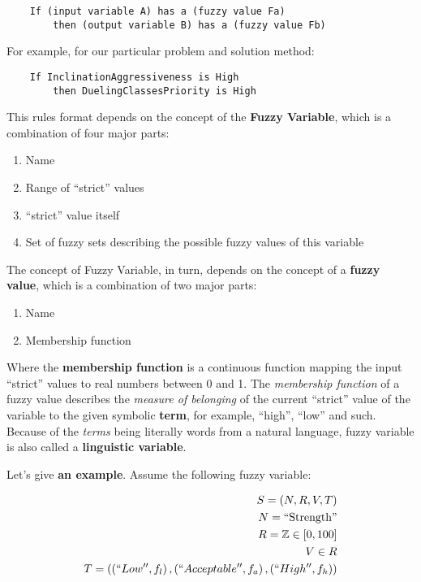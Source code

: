 \documentclass[12pt, a4paper]{article}
\begin{document}
  \begin{verbatim}
    If (input variable A) has a (fuzzy value Fa) 
    	then (output variable B) has a (fuzzy value Fb)
  \end{verbatim}

  For example, for our particular problem and solution method:

  \begin{verbatim}
    If InclinationAggressiveness is High 
    	then DuelingClassesPriority is High
  \end{verbatim}

  This rules format depends on the concept of the \textbf{Fuzzy Variable}, which is a combination of four major parts:

  \begin{enumerate}
    \item Name
    \item Range of ``strict'' values
    \item ``strict'' value itself
    \item Set of fuzzy sets describing the possible fuzzy values of this variable
  \end{enumerate}

  The concept of Fuzzy Variable, in turn, depends on the concept of a \textbf{fuzzy value}, which is a combination of two major parts:

  \begin{enumerate}
    \item Name
    \item Membership function
  \end{enumerate}

  Where the \textbf{membership function} is a continuous function mapping the input ``strict'' values to real numbers between 0 and 1.
  The \textit{membership function} of a fuzzy value describes the \textit{measure of belonging} of the current ``strict'' value of the variable to the given symbolic \textbf{term},
  for example, ``high'', ``low'' and such.
  Because of the \textit{terms} being literally words from a natural language, fuzzy variable is also called a \textbf{linguistic variable}.

  Let's give \textbf{an example}.
  Assume the following fuzzy variable:

  \begin{eqnarray}
    S = \left(N, R, V, T\right)\\
    N = \textrm{``Strength''}\\
    R = \mathbb{Z} \in [0, 100]\\
    V \in R\\
    T = \left(\left(``Low'', f_l\right), \left(``Acceptable'', f_a\right), \left(``High'', f_h\right)\right)
  \end{eqnarray}
\end{document}
